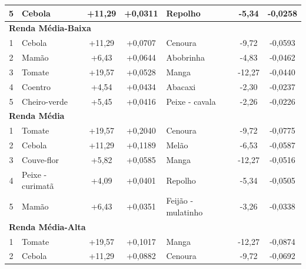 \documentclass[10pt,a4paper]{article}
\begin{document}
\begin{table}[h!]
\begin{tabular*}{\textwidth}{@{\extracolsep{\fill}} c l c c | l c c @{}}
			5 & Cebola & +11,29 & +0,0311 & Repolho & -5,34 & -0,0258 \\
			
			\midrule
			
			\multicolumn{7}{l}{\textbf{\color{bisnavy}Renda Média-Baixa}} \\
			\midrule
			
			1 & Cebola & +11,29 & +0,0707 & Cenoura & -9,72 & -0,0593 \\
			
			2 & Mamão & +6,43 & +0,0644 & Abobrinha & -4,83 & -0,0462 \\
			
			3 & Tomate & +19,57 & +0,0528 & Manga & -12,27 & -0,0440 \\
			
			4 & Coentro & +4,54 & +0,0434 & Abacaxi & -2,30 & -0,0237 \\
			
			5 & Cheiro-verde & +5,45 & +0,0416 & Peixe - cavala & -2,26 & -0,0226 \\
			
			\midrule
			
			\multicolumn{7}{l}{\textbf{\color{bisnavy}Renda Média}} \\
			\midrule
			
			1 & Tomate & +19,57 & +0,2040 & Cenoura & -9,72 & -0,0775 \\
			
			2 & Cebola & +11,29 & +0,1189 & Melão & -6,53 & -0,0587 \\
			
			3 & Couve-flor & +5,82 & +0,0585 & Manga & -12,27 & -0,0516 \\
			
			4 & Peixe - curimatã & +4,09 & +0,0401 & Repolho & -5,34 & -0,0505 \\
			
			5 & Mamão & +6,43 & +0,0351 & Feijão - mulatinho & -3,26 & -0,0338 \\
			
			\midrule
			
			\multicolumn{7}{l}{\textbf{\color{bisnavy}Renda Média-Alta}} \\
			\midrule
			
			1 & Tomate & +19,57 & +0,1017 & Manga & -12,27 & -0,0874 \\
			
			2 & Cebola & +11,29 & +0,0882 & Cenoura & -9,72 & -0,0692 \\
			

\end{tabular*}
\end{table}
\end{document}
